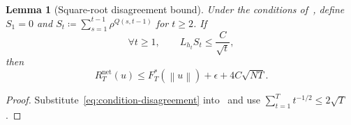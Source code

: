 \documentclass[journal]{IEEEtran}
\newtheorem{lemma}{Lemma}
\newcommand{\norm}[1]{\left\lVert{#1}\right\rVert}
\begin{document}
    {\color{blue}
        \begin{lemma}[Square-root disagreement bound]\label{lemma:square-root-disagreement}
            Under the conditions of~, define
            $S_1=0$ and $S_t\coloneqq\sum_{s=1}^{t-1}\rho^{Q(s,t-1)}$ for $t\geq2$.
            If
            \begin{equation}\label{eq:condition-disagreement}
                \forall t\geq1,\qquad L_{h_t}S_t\leq\frac{C}{\sqrt{t}},
            \end{equation}
            then
            \begin{equation}
                R_T^{\mathrm{net}}(u)
                \leq F_T^*(\norm{u})+\epsilon+4C\sqrt{NT}.
            \end{equation}
        \end{lemma}
        \begin{proof}
            Substitute~\eqref{eq:condition-disagreement} into~ and use
            $\sum_{t=1}^T t^{-1/2}\leq2\sqrt{T}$.
        \end{proof}
    }
\end{document}
